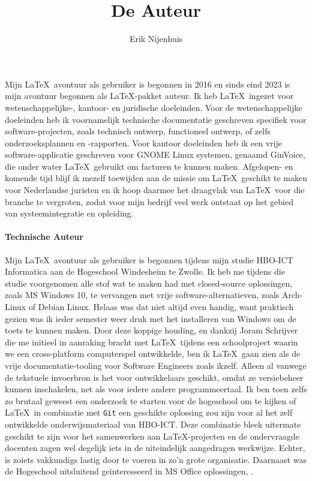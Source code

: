 \documentclass[dutch]{ltugboat}
\title{De Auteur}
\author{Erik Nijenhuis}
\begin{document}
    \maketitle

    Mijn \LaTeX\ avontuur als gebruiker is begonnen in 2016 en sinds eind 2023 is mijn avontuur begonnen als \LaTeX-pakket auteur.
    Ik heb \LaTeX\ ingezet voor wetenschappelijke-, kantoor- en juridische doeleinden.
    Voor de wetenschappelijke doeleinden heb ik voornamelijk technische documentatie geschreven specifiek voor software-projecten, zoals technisch ontwerp, functioneel ontwerp, of zelfs onderzoeksplannen en -rapporten.
    Voor kantoor doeleinden heb ik een vrije software-applicatie geschreven voor GNOME Linux systemen, genaamd GinVoice, die onder water \LaTeX\ gebruikt om facturen te kunnen maken.
    Afgelopen- en komende tijd blijf ik mezelf toewijden aan de missie om \LaTeX\ geschikt te maken voor Nederlandse juristen en ik hoop daarmee het draagvlak van \LaTeX\ voor die branche te vergroten, zodat voor mijn bedrijf veel werk ontstaat op het gebied van systeemintegratie en opleiding.

    \paragraph{Technische Auteur}
    Mijn \LaTeX\ avontuur als gebruiker is begonnen tijdens mijn studie HBO-ICT Informatica aan de Hogeschool Windesheim te Zwolle.
    Ik heb me tijdens die studie voorgenomen alle stof wat te maken had met closed-source oplossingen, zoals MS Windows 10, te vervangen met vrije software-alternatieven, zoals Arch-Linux of Debian Linux.
    Helaas was dat niet altijd even handig, want praktisch gezien was ik ieder semester weer druk met het installeren van Windows om de toets te kunnen maken.
    Door deze koppige houding, en dankzij Joram Schrijver die me initieel in aanraking bracht met \LaTeX\ tijdens een schoolproject waarin we een cross-platform computerspel ontwikkelde, ben ik \LaTeX\ gaan zien als de vrije documentatie-tooling voor Software Engineers zoals ikzelf.
    Alleen al vanwege de tekstuele invoerbron is het voor ontwikkelaars geschikt, omdat ze versiebeheer kunnen inschakelen, net als voor iedere andere programmeertaal.
    Ik ben toen zelfs zo brutaal geweest een onderzoek te starten voor de hogeschool om te kijken of \LaTeX\ in combinatie met \texttt{Git} een geschikte oplossing zou zijn voor al het zelf ontwikkelde onderwijsmateriaal van HBO-ICT\@.
    Deze combinatie bleek uitermate geschikt te zijn voor het samenwerken aan \LaTeX-projecten en de ondervraagde docenten zagen wel degelijk iets in de uiteindelijk aangedragen werkwijze.
    Echter, is zoiets vakkundigs lastig door te voeren in zo'n grote organisatie.
    Daarnaast was de Hogeschool uitsluitend geïnteresseerd in MS Office oplossingen, .
\end{document}
